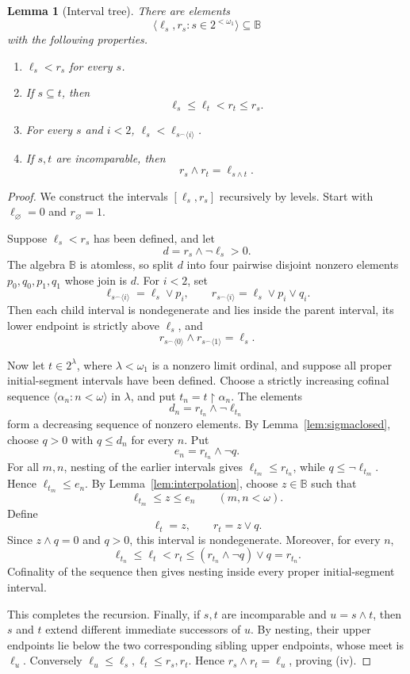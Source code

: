 \documentclass[11pt]{article}
\newtheorem{lemma}[theorem]{Lemma}
\theoremstyle{definition}
\theoremstyle{remark}
\newcommand{\B}{\mathbb B}
\newcommand{\restr}{\mathbin{\upharpoonright}}
\newcommand{\concat}{\mathbin{{}^\frown}}
\begin{document}
\begin{lemma}[Interval tree]\label{lem:tree}
There are elements
\[
  \langle \ell_s,r_s:s\in2^{<\omega_1}\rangle
  \subseteq\B
\]
with the following properties.
\begin{enumerate}[label=\textup{(\roman*)}]
\item \(\ell_s<r_s\) for every \(s\).
\item If \(s\subseteq t\), then
\[
  \ell_s\leq\ell_t<r_t\leq r_s.
\]
\item For every \(s\) and \(i<2\),
\(\ell_s<\ell_{s\concat\langle i\rangle}\).
\item If \(s,t\) are incomparable, then
\[
  r_s\wedge r_t=\ell_{s\wedge t}.
\]
\end{enumerate}
\end{lemma}

\begin{proof}
We construct the intervals \([\ell_s,r_s]\) recursively by levels.  Start
with \(\ell_\varnothing=0\) and \(r_\varnothing=1\).

Suppose \(\ell_s<r_s\) has been defined, and let
\[
  d=r_s\wedge\neg\ell_s>0.
\]
The algebra \(\B\) is atomless, so split \(d\) into four pairwise disjoint
nonzero elements
\(p_0,q_0,p_1,q_1\) whose join is \(d\).  For \(i<2\), set
\[
  \ell_{s\concat\langle i\rangle}=\ell_s\vee p_i,
  \qquad
  r_{s\concat\langle i\rangle}=\ell_s\vee p_i\vee q_i.
\]
Then each child interval is nondegenerate and lies inside the parent interval,
its lower endpoint is strictly above \(\ell_s\), and
\[
  r_{s\concat\langle0\rangle}
  \wedge r_{s\concat\langle1\rangle}=\ell_s.
\]

Now let \(t\in2^\lambda\), where \(\lambda<\omega_1\) is a nonzero limit
ordinal, and suppose all proper initial-segment intervals have been defined.
Choose a strictly increasing cofinal sequence
\(\langle\alpha_n:n<\omega\rangle\) in \(\lambda\), and put
\(t_n=t\restr\alpha_n\).  The elements
\[
  d_n=r_{t_n}\wedge\neg\ell_{t_n}
\]
form a decreasing sequence of nonzero elements.  By
Lemma~\ref{lem:sigmaclosed}, choose \(q>0\) with \(q\leq d_n\) for every
\(n\).  Put
\[
  e_n=r_{t_n}\wedge\neg q.
\]
For all \(m,n\), nesting of the earlier intervals gives
\(\ell_{t_m}\leq r_{t_n}\), while \(q\leq\neg\ell_{t_m}\).  Hence
\(\ell_{t_m}\leq e_n\).  By Lemma~\ref{lem:interpolation}, choose
\(z\in\B\) such that
\[
  \ell_{t_m}\leq z\leq e_n
  \qquad(m,n<\omega).
\]
Define
\[
  \ell_t=z,
  \qquad
  r_t=z\vee q.
\]
Since \(z\wedge q=0\) and \(q>0\), this interval is nondegenerate.  Moreover,
for every \(n\),
\[
  \ell_{t_n}\leq\ell_t<r_t
  \leq (r_{t_n}\wedge\neg q)\vee q=r_{t_n}.
\]
Cofinality of the sequence then gives nesting inside every proper
initial-segment interval.

This completes the recursion.  Finally, if \(s,t\) are incomparable and
\(u=s\wedge t\), then \(s\) and \(t\) extend different immediate successors
of \(u\).  By nesting, their upper endpoints lie below the two corresponding
sibling upper endpoints, whose meet is \(\ell_u\).  Conversely
\(\ell_u\leq\ell_s,\ell_t\leq r_s,r_t\).  Hence
\(r_s\wedge r_t=\ell_u\), proving (iv).
\end{proof}
\end{document}
